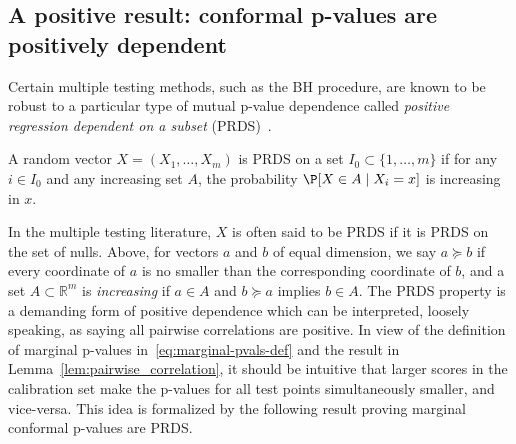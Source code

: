 
\subsection{A positive result: conformal p-values are positively dependent} \label{sec:positive-fdr}

Certain multiple testing methods, such as the BH procedure, are known to be robust to a particular type of mutual p-value dependence called \emph{positive regression dependent on a subset} (PRDS)~\cite{benjamini2001control}.
\begin{defn} \label{def:PRDS}
A random vector $X = (X_1,\dots,X_m)$ is PRDS on a set $I_0\subset \{1, \ldots, m\}$ if for any $i \in I_0$ and any increasing set $A$, the probability $\P[X \in A \mid X_i = x]$ is increasing in $x$.
\end{defn}
In the multiple testing literature, $X$ is often said to be PRDS if it is PRDS on the set of nulls. Above, for vectors $a$ and $b$ of equal dimension, we say $a \succeq b$ if every coordinate of $a$ is no smaller than the corresponding coordinate of $b$, and a set $A \subset \mathbb{R}^m$ is \emph{increasing} if $a \in A$ and $b \succeq a$ implies $b \in A$.
The PRDS property is a demanding form of positive dependence which can be interpreted, loosely speaking, as saying all pairwise correlations are positive.
In view of the definition of marginal p-values in~\eqref{eq:marginal-pvals-def} and the result in Lemma~\ref{lem:pairwise_correlation}, it should be intuitive that larger scores in the calibration set make the p-values for all test points simultaneously smaller, and vice-versa. This idea is formalized by the following result proving marginal conformal p-values are PRDS.

